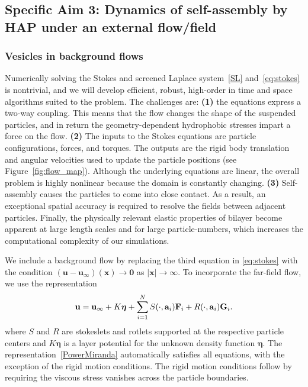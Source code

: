 \subsection{Specific Aim 3: Dynamics of self-assembly by HAP under an external flow/field}
\label{subsec:specific_aim_3}

\subsubsection{Vesicles in background flows}
Numerically solving the Stokes and screened Laplace system~\eqref{SL}
and~\eqref{eq:stokes} is nontrivial, and we will develop efficient,
robust, high-order in time and space algorithms suited to the problem.
The challenges are: {\bf (1)} the equations express a two-way coupling.
This means that the flow changes the shape of the suspended particles,
and in return the geometry-dependent hydrophobic stresses impart a force
on the flow. {\bf (2)} The inputs to the Stokes equations are particle
configurations, forces, and torques. The outputs are the rigid body
translation and angular velocities used to update the particle positions
(see Figure~\ref{fig:flow_map}). Although the underlying equations are
linear, the overall problem is highly nonlinear because the domain is
constantly changing. {\bf (3)} Self-assembly causes the particles to
come into close contact. As a result, an exceptional spatial accuracy is
required to resolve the fields between adjacent particles. Finally, the
physically relevant elastic properties of bilayer become apparent at
large length scales and for large particle-numbers, which increases the
computational complexity of our simulations. 

We include a background flow by replacing the third equation in
\eqref{eq:stokes} with the condition $(\mathbf{u} -
\mathbf{u}_{\infty})(\mathbf{x}) \to \mathbf{0}$ as $|\mathbf{x}| \to
\infty$. To incorporate the far-field flow, we use the representation 
\begin{align}
\label{PowerMiranda}
  {\bf u} = {\bf u}_{\infty} + K\boldsymbol{\eta} + 
    \sum_{i=1}^N S(\cdot, {\bf a}_i) {\bf F}_i + 
                 R(\cdot, {\bf a}_i) {\bf G}_i.
\end{align}
where $S$ and $R$ are stokeslets and rotlets supported at the respective
particle centers  \cite{leal_2007} and $K\boldsymbol{\eta}$ is a layer potential for the
unknown density function $\boldsymbol{\eta}.$ The
representation~\eqref{PowerMiranda} automatically satisfies all
equations, with the exception of the rigid motion conditions. The rigid
motion conditions follow by requiring the viscous stress vanishes across
the particle boundaries.

